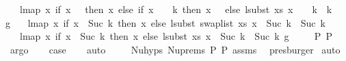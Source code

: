 \begin{isabellebody}
\ \ \ {\isacharparenleft}{\kern0pt}lmap\ {\isacharparenleft}{\kern0pt}{\isasymlambda}x{\isachardot}{\kern0pt}\ if\ x\ {\isacharequal}{\kern0pt}\ {}\ then\ x\ else\ {\isacharparenleft}{\kern0pt}if\ x\ {\isacharminus}{\kern0pt}\ {}\ {\isacharless}{\kern0pt}\ k\ then\ x\ {\isacharminus}{\kern0pt}\ {}\ else\ lsubst\ xs\ {\isacharparenleft}{\kern0pt}x\ {\isacharminus}{\kern0pt}\ {}\ {\isacharminus}{\kern0pt}\ k{\isacharparenright}{\kern0pt}\ {\isacharplus}{\kern0pt}\ k{\isacharparenright}{\kern0pt}\ {\isacharplus}{\kern0pt}\ {}{\isacharparenright}{\kern0pt}\ g{\isacharprime}{\kern0pt}{\isacharparenright}{\kern0pt}\ {\isacharequal}{\kern0pt}\isanewline
\ \ lmap\ {\isacharparenleft}{\kern0pt}{\isasymlambda}x{\isachardot}{\kern0pt}\ if\ x\ {\isacharless}{\kern0pt}\ Suc\ k\ then\ x\ else\ lsubst\ {\isacharparenleft}{\kern0pt}swap{\isacharunderscore}{\kern0pt}list\ xs{\isacharparenright}{\kern0pt}\ {\isacharparenleft}{\kern0pt}x\ {\isacharminus}{\kern0pt}\ {\isacharparenleft}{\kern0pt}Suc\ k{\isacharparenright}{\kern0pt}{\isacharparenright}{\kern0pt}\ {\isacharplus}{\kern0pt}\ {\isacharparenleft}{\kern0pt}Suc\ k{\isacharparenright}{\kern0pt}{\isacharparenright}{\kern0pt}\isanewline
\ \ \ {\isacharparenleft}{\kern0pt}lmap\ {\isacharparenleft}{\kern0pt}{\isasymlambda}x{\isachardot}{\kern0pt}\ if\ x\ {\isacharless}{\kern0pt}\ Suc\ k\ then\ x\ else\ lsubst\ xs\ {\isacharparenleft}{\kern0pt}x\ {\isacharminus}{\kern0pt}\ {\isacharparenleft}{\kern0pt}Suc\ k{\isacharparenright}{\kern0pt}{\isacharparenright}{\kern0pt}\ {\isacharplus}{\kern0pt}\ {\isacharparenleft}{\kern0pt}Suc\ k{\isacharparenright}{\kern0pt}{\isacharparenright}{\kern0pt}\ g{\isacharprime}{\kern0pt}{\isacharparenright}{\kern0pt}{\isachardoublequoteclose}\isanewline
\ \ \ \isamarkupfalse%
\ P{}\ P{}\ \isamarkupfalse%
\ argo\isanewline
\isanewline
\ \ \isamarkupfalse%
\ {\isacharquery}{\kern0pt}case\isanewline
\ \ \isamarkupfalse%
\ auto\isanewline
\ \ \ \isamarkupfalse%
\ Nu{\isachardot}{\kern0pt}hyps\ Nu{\isachardot}{\kern0pt}prems{\isacharparenleft}{\kern0pt}{}{\isacharparenright}{\kern0pt}\ P{}\ P{}\ assms{\isacharparenleft}{\kern0pt}{}{\isacharparenright}{\kern0pt}\ \isamarkupfalse%
\ presburger\isanewline
{}\isamarkupfalse%
\ auto%
\endisatagproof
{\isafoldproof}%
%
\isadelimproof
\isanewline
%
\endisadelimproof
\isanewline
\isanewline
{}\isamarkupfalse%

\end{isabellebody}
